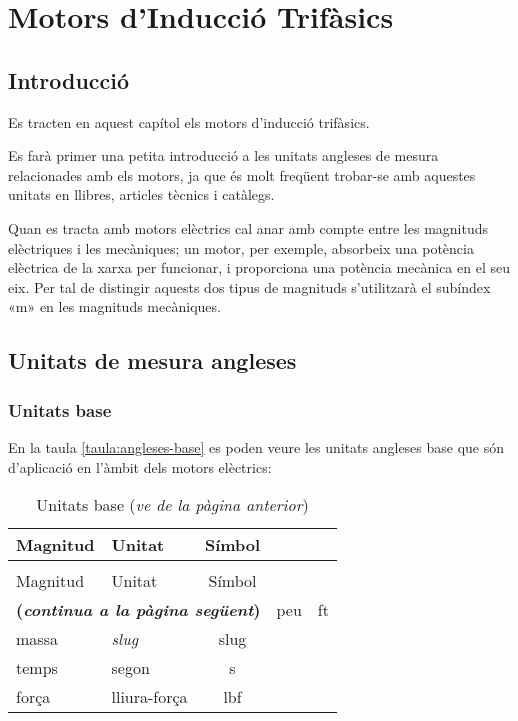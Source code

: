 \chapter{Motors d'Inducció Trifàsics}\label{sec:ch-motors-ind}

\section{Introducció}

Es tracten en aquest capítol els motors d'inducció trifàsics.

Es farà primer una petita introducció a les unitats angleses de mesura  relacionades amb els motors, ja que és molt freqüent trobar-se amb aquestes unitats en llibres, articles tècnics i catàlegs.

Quan es tracta amb motors elèctrics cal anar amb compte entre les magnituds elèctriques i les mecàniques; un motor, per exemple, absorbeix una potència elèctrica de la xarxa per funcionar, i proporciona una potència mecànica en el seu eix. Per tal de distingir aquests dos tipus de magnituds s'utilitzarà el subíndex «m» en les magnituds mecàniques.

\section{Unitats de mesura angleses}

\subsection{Unitats base}

En la taula \vref{taula:angleses-base} es poden veure les unitats angleses base  que són d'aplicació en l'àmbit dels motors elèctrics:
\begin{longtable}[h]{llc}
   \caption{\label{taula:angleses-base}Unitats angleses base}\\
   \toprule[1pt]
    Magnitud & Unitat & Símbol \\
   \midrule
   \endfirsthead
   \caption[]{Unitats base (\emph{ve de la pàgina anterior})}\\
   \toprule[1pt]
    Magnitud & Unitat & Símbol \\
   \midrule
   \endhead
   \midrule
   \multicolumn{3}{r}{\sffamily\bfseries\color{NavyBlue}(\emph{continua a la pàgina següent})}
   \endfoot
   \endlastfoot
   longitud & peu & ft \\
   massa & \textit{slug} & slug \\
   temps & segon & s\\
   força & lliura-força & lbf \\
   \bottomrule[1pt]
\end{longtable}

